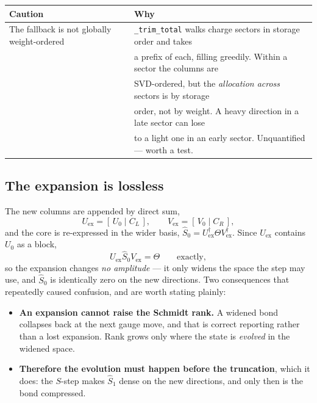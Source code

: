 \documentclass[11pt,a4paper]{article}
\newcommand{\Theb}{\Theta}
\newcommand{\Uex}{U_{\mathrm{ex}}}
\newcommand{\Vex}{V_{\mathrm{ex}}}
\newcommand{\code}[1]{\texttt{\small #1}}
\begin{document}
\begin{center}
\small
\begin{tabular}{@{}ll@{}}
\toprule
\textbf{Caution} & \textbf{Why} \\
\midrule
The fallback is not globally weight-ordered
  & \code{\_trim\_total} walks charge sectors in storage order and takes \\
  & a prefix of each, filling greedily. Within a sector the columns are \\
  & SVD-ordered, but the \emph{allocation across} sectors is by storage \\
  & order, not by weight. A heavy direction in a late sector can lose \\
  & to a light one in an early sector. Unquantified --- worth a test. \\
\bottomrule
\end{tabular}
\end{center}

\subsection{The expansion is lossless}

The new columns are appended by direct sum,
\begin{equation}
  \Uex = [\,U_0 \mid C_L\,],
  \qquad
  \Vex = [\,V_0 \mid C_R\,],
\end{equation}
and the core is re-expressed in the wider basis,
$\hat S_0 = \Uex^\dagger \Theb \Vex^\dagger$. Since $\Uex$ contains $U_0$ as a block,
\begin{equation}
  \Uex \hat S_0 \Vex = \Theb
  \qquad\text{exactly},
\end{equation}
so the expansion changes \emph{no amplitude} --- it only widens the space the step may use, and
$\hat S_0$ is identically zero on the new directions. Two consequences that repeatedly caused
confusion, and are worth stating plainly:

\begin{itemize}[leftmargin=1.2em]
\item \textbf{An expansion cannot raise the Schmidt rank.} A widened bond collapses back at the
next gauge move, and that is correct reporting rather than a lost expansion. Rank grows only
where the state is \emph{evolved} in the widened space.
\item \textbf{Therefore the evolution must happen before the truncation}, which it does: the
$S$-step makes $\hat S_1$ dense on the new directions, and only then is the bond compressed.
\end{itemize}
\end{document}
